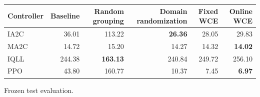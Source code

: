 \begin{tabular}{lrrrrr}
\hline
Controller & Baseline & Random grouping & Domain randomization & Fixed WCE & Online WCE \\
\hline
IA2C & 36.01 & 113.22 & \textbf{26.36} & 28.05 & 29.83 \\
MA2C & 14.72 & 15.20 & 14.27 & 14.32 & \textbf{14.02} \\
IQLL & 244.38 & \textbf{163.13} & 240.84 & 249.72 & 256.10 \\
PPO & 43.80 & 160.77 & 10.37 & 7.45 & \textbf{6.97} \\
\hline
\end{tabular}
Frozen test evaluation.
